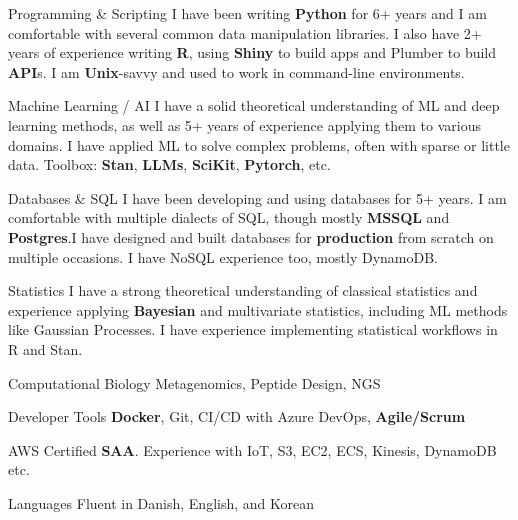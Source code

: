 


\begin{cvskills}


\cvskill
{Programming \& Scripting} %
{I have been writing \textbf{Python} for 6+ years and I am comfortable with several common data manipulation libraries. I also have 2+ years of experience writing \textbf{R}, using \textbf{Shiny} to build apps and Plumber to build \textbf{API}s. I am \textbf{Unix}-savvy and used to work in command-line environments.} %


\cvskill
{Machine Learning / AI} %
{I have a solid theoretical understanding of ML and deep learning methods, as well as 5+ years of experience applying them to various domains. I have applied ML to solve complex problems, often with sparse or little data. Toolbox: \textbf{Stan}, \textbf{LLMs}, \textbf{SciKit}, \textbf{Pytorch}, etc.} %


\cvskill
{Databases \& SQL}
{I have been developing and using databases for 5+ years. I am comfortable with multiple dialects of SQL, though mostly \textbf{MSSQL} and \textbf{Postgres}.I have designed and built databases for \textbf{production} from scratch on multiple occasions. I have NoSQL experience too, mostly DynamoDB.}

\cvskill
{Statistics}
{I have a strong theoretical understanding of classical statistics and experience applying \textbf{Bayesian} and multivariate statistics, including ML methods like Gaussian Processes. I have experience implementing statistical workflows in R and Stan.}

\cvskill
{Computational Biology}
{Metagenomics, Peptide Design, NGS}

\cvskill
{Developer Tools}
{\textbf{Docker}, Git, CI/CD with Azure DevOps, \textbf{Agile/Scrum}}

\cvskill
{AWS}
{Certified \textbf{SAA}. Experience with IoT, S3, EC2, ECS, Kinesis, DynamoDB etc.}


\cvskill
{Languages} %
{Fluent in Danish, English, and Korean} %


\end{cvskills}